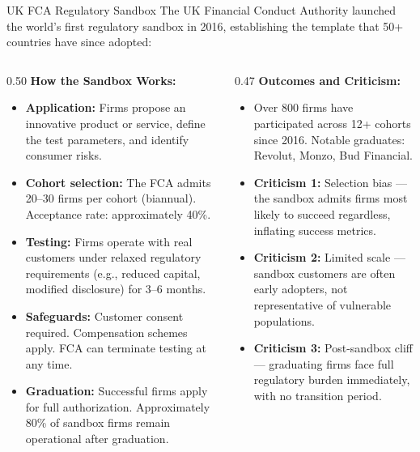\begin{frame}{UK FCA Regulatory Sandbox}
  The UK Financial Conduct Authority launched the world's first regulatory
  sandbox in 2016, establishing the template that 50+ countries have since
  adopted:

  \vspace{0.5em}
  \begin{columns}[T]
    \begin{column}{0.50\textwidth}
      \textcolor{mlpurple}{\textbf{How the Sandbox Works:}}
      \begin{itemize}
        \item \textbf{Application:} Firms propose an innovative product or
              service, define the test parameters, and identify consumer
              risks.
        \item \textbf{Cohort selection:} The FCA admits 20--30 firms per
              cohort (biannual). Acceptance rate: approximately 40\%.
        \item \textbf{Testing:} Firms operate with real customers under
              relaxed regulatory requirements (e.g., reduced capital, modified
              disclosure) for 3--6 months.
        \item \textbf{Safeguards:} Customer consent required. Compensation
              schemes apply. FCA can terminate testing at any time.
        \item \textbf{Graduation:} Successful firms apply for full
              authorization. Approximately 80\% of sandbox firms remain
              operational after graduation.
      \end{itemize}
    \end{column}
    \begin{column}{0.47\textwidth}
      \textcolor{mlpurple}{\textbf{Outcomes and Criticism:}}
      \begin{itemize}
        \item Over 800 firms have participated across 12+ cohorts since 2016.
              Notable graduates: Revolut, Monzo, Bud Financial.
        \item \textbf{Criticism 1:} Selection bias --- the sandbox admits
              firms most likely to succeed regardless, inflating success
              metrics.
        \item \textbf{Criticism 2:} Limited scale --- sandbox customers
              are often early adopters, not representative of vulnerable
              populations.
        \item \textbf{Criticism 3:} Post-sandbox cliff --- graduating firms
              face full regulatory burden immediately, with no transition
              period.
      \end{itemize}


\end{column}
\end{columns}
\end{frame}
